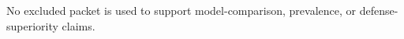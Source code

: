 \documentclass{article}
\begin{document}
\begin{table}[ht]
\centering
\caption{Included and excluded local run packets. Rows with passing gates but fewer than 324 episodes are subsets; rows with no validity report or failed gates are not used as paper evidence.}
\label{tab:attempted-runs}
\scriptsize
\resizebox{\linewidth}{!}{%

}
\end{table}

No excluded packet is used to support model-comparison, prevalence, or defense-superiority claims.

\newpage

\end{document}
